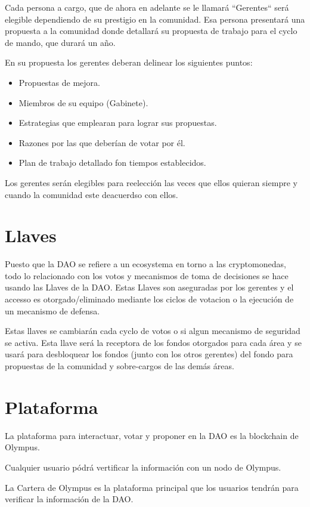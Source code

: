 \documentclass{article}
\begin{document}
Cada persona a cargo, que de ahora en adelante se le llamará ``Gerentes`` será elegible dependiendo de su prestigio en la comunidad. Esa persona presentará una propuesta a la comunidad donde detallará su propuesta de trabajo para el cyclo de mando, que durará un año.

En su propuesta los gerentes deberan delinear los siguientes puntos:

\begin{itemize}
  \item Propuestas de mejora.
  \item Miembros de su equipo (Gabinete).
  \item Estrategias que emplearan para lograr sus propuestas.
  \item Razones por las que deberían de votar por él.
  \item Plan de trabajo detallado fon tiempos establecidos.
\end{itemize}

Los gerentes serán elegibles para reelección las veces que ellos quieran siempre y cuando la comunidad este deacuerdso con ellos.

\section{Llaves}

Puesto que la DAO se refiere a un ecosystema en torno a las cryptomonedas, todo lo relacionado con los votos y mecanismos de toma de decisiones se hace usando las Llaves de la DAO. Estas Llaves son aseguradas por los gerentes y el accesso es otorgado/eliminado mediante los ciclos de votacion o la ejecución de un mecanismo de defensa.

Estas llaves se cambiarán cada cyclo de votos o si algun mecanismo de seguridad se activa. Esta llave será la receptora de los fondos otorgados para cada área y se usará para desbloquear los fondos (junto con los otros gerentes) del fondo para propuestas de la comunidad y sobre-cargos de las demás áreas.

\section{Plataforma}

La plataforma para interactuar, votar y proponer en la DAO es la blockchain de Olympus.

Cualquier usuario pódrá vertificar la información con un nodo de Olympus.

La Cartera de Olympus es la plataforma principal que los usuarios tendrán para verificar la información de la DAO.
\end{document}

